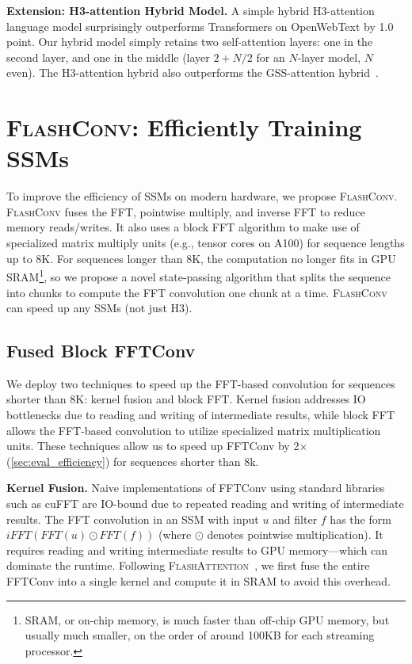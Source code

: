 \textbf{Extension: H3-attention Hybrid Model.} A simple hybrid \textsc{H3}-attention language model surprisingly outperforms Transformers on OpenWebText by 1.0 point. Our hybrid model simply retains two self-attention layers: one in the second layer, and one in the middle (layer $2 + N / 2$ for an $N$-layer model, $N$ even). The \textsc{H3}-attention hybrid also outperforms the GSS-attention hybrid~\citep{mehta2022long}.

\section{\textsc{FlashConv}: Efficiently Training SSMs\label{sec:efficiency}}

To improve the efficiency of SSMs on modern hardware, we propose \textsc{FlashConv}.
\textsc{FlashConv} fuses the FFT, pointwise multiply, and inverse FFT to reduce memory reads/writes. It also uses a block FFT algorithm to make use of specialized matrix multiply units (e.g., tensor cores on A100) for sequence lengths up to 8K. For sequences longer than 8K, the computation no longer fits in GPU SRAM\footnote{SRAM, or on-chip memory, is much faster than off-chip GPU memory, but usually much smaller, on the order of around 100KB for each streaming processor.}, so we propose a novel state-passing algorithm that splits the sequence into chunks to compute the FFT convolution one chunk at a time.
\textsc{FlashConv} can speed up any SSMs (not just \textsc{H3}).

\subsection{Fused Block FFTConv}
\label{sec:systolic_fft}

We deploy two techniques to speed up the FFT-based convolution for sequences shorter than 8K: kernel fusion and block FFT. Kernel fusion addresses IO bottlenecks due to reading and writing of intermediate results, while block FFT allows the FFT-based convolution to utilize specialized matrix multiplication units. These techniques allow us to speed up FFTConv by 2$\times$ (\ref{sec:eval_efficiency}) for sequences shorter than 8k.

\textbf{Kernel Fusion.} Naive implementations of FFTConv using standard libraries such as cuFFT are IO-bound due to repeated reading and writing of intermediate results. The FFT convolution in an SSM with input $u$ and filter $f$ has the form $iFFT(FFT(u) \odot FFT(f))$ (where $\odot$ denotes pointwise multiplication). It requires reading and writing intermediate results to GPU memory---which can dominate the runtime. Following \textsc{FlashAttention}~\citep{dao2022flashattention}, we first fuse the entire FFTConv into a single kernel and compute it in SRAM to avoid this overhead.

